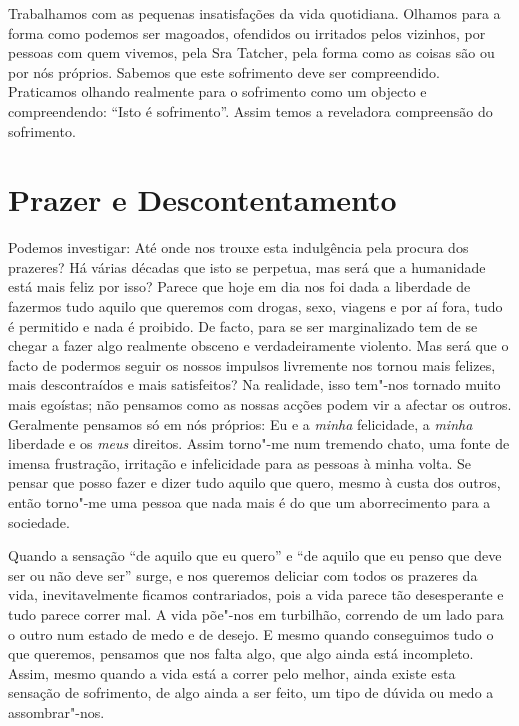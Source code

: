 Trabalhamos com as pequenas insatisfações da vida quotidiana. Olhamos para a
forma como podemos ser magoados, ofendidos ou irritados pelos vizinhos, por
pessoas com quem vivemos, pela Sra Tatcher, pela forma como as coisas são ou por
nós próprios. Sabemos que este sofrimento deve ser compreendido. Praticamos
olhando realmente para o sofrimento como um objecto e compreendendo: “Isto é
sofrimento”. Assim temos a reveladora compreensão do sofrimento.

\section{Prazer e Descontentamento}

\enlargethispage{\baselineskip}

Podemos investigar: Até onde nos trouxe esta indulgência pela procura dos
prazeres? Há várias décadas que isto se perpetua, mas será que a humanidade está
mais feliz por isso? Parece que hoje em dia nos foi dada a liberdade de fazermos
tudo aquilo que queremos com drogas, sexo, viagens e por aí fora, tudo é
permitido e nada é proibido. De facto, para se ser marginalizado tem de se
chegar a fazer algo realmente obsceno e verdadeiramente violento. Mas será que o
facto de podermos seguir os nossos impulsos livremente nos tornou mais felizes,
mais descontraídos e mais satisfeitos? Na realidade, isso tem"-nos tornado muito
mais egoístas; não pensamos como as nossas acções podem vir a afectar os outros.
Geralmente pensamos só em nós próprios: Eu e a \emph{minha} felicidade, a
\emph{minha} liberdade e os \emph{meus} direitos. Assim torno"-me num tremendo
chato, uma fonte de imensa frustração, irritação e infelicidade para as pessoas
à minha volta. Se pensar que posso fazer e dizer tudo aquilo que quero, mesmo à
custa dos outros, então torno"-me uma pessoa que nada mais é do que um
aborrecimento para a sociedade.

Quando a sensação “de aquilo que eu quero” e “de aquilo que eu penso que deve ser ou
não deve ser” surge, e nos queremos deliciar com todos os prazeres da vida,
inevitavelmente ficamos contrariados, pois a vida parece tão desesperante e
tudo parece correr mal. A vida põe"-nos em turbilhão, correndo de um lado para o
outro num estado de medo e de desejo. E mesmo quando conseguimos tudo o que
queremos, pensamos que nos falta algo, que algo ainda está incompleto. Assim,
mesmo quando a vida está a correr pelo melhor, ainda existe esta sensação de
sofrimento, de algo ainda a ser feito, um tipo de dúvida ou medo a
assombrar"-nos.

